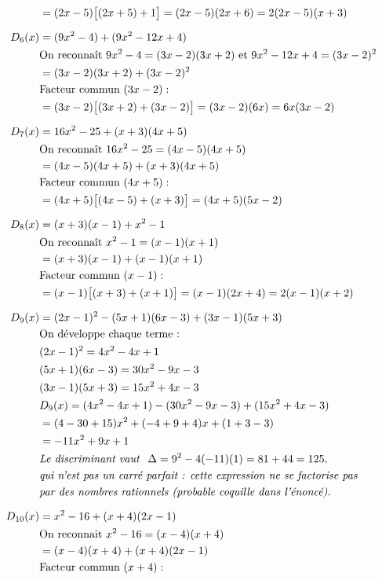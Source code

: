 \documentclass[11pt]{article}
\begin{document}
\[\begin{aligned}
		&= (2x-5)\big[(2x+5)+1\big] = (2x-5)(2x+6) = 2(2x-5)(x+3)\\[6pt]
		D_6(x) &= (9x^2-4)+(9x^2-12x+4)\\
		&\text{On reconnaît } 9x^2-4=(3x-2)(3x+2) \text{ et } 9x^2-12x+4=(3x-2)^2\\
		&= (3x-2)(3x+2)+(3x-2)^2\\
		&\text{Facteur commun } (3x-2) :\\
		&= (3x-2)\big[(3x+2)+(3x-2)\big] = (3x-2)(6x) = 6x(3x-2)\\[6pt]
		D_7(x) &= 16x^2-25+(x+3)(4x+5)\\
		&\text{On reconnaît } 16x^2-25=(4x-5)(4x+5)\\
		&= (4x-5)(4x+5)+(x+3)(4x+5)\\
		&\text{Facteur commun } (4x+5) :\\
		&= (4x+5)\big[(4x-5)+(x+3)\big] = (4x+5)(5x-2)\\[6pt]
		D_8(x) &= (x+3)(x-1)+x^2-1\\
		&\text{On reconnaît } x^2-1=(x-1)(x+1)\\
		&= (x+3)(x-1)+(x-1)(x+1)\\
		&\text{Facteur commun } (x-1) :\\
		&= (x-1)\big[(x+3)+(x+1)\big] = (x-1)(2x+4) = 2(x-1)(x+2)\\[6pt]
		D_9(x) &= (2x-1)^2-(5x+1)(6x-3)+(3x-1)(5x+3)\\
		&\text{On développe chaque terme :}\\
		&(2x-1)^2 = 4x^2-4x+1\\
		&(5x+1)(6x-3) = 30x^2-9x-3\\
		&(3x-1)(5x+3) = 15x^2+4x-3\\
		&D_9(x) = (4x^2-4x+1)-(30x^2-9x-3)+(15x^2+4x-3)\\
		&= (4-30+15)x^2+(-4+9+4)x+(1+3-3)\\
		&= -11x^2+9x+1\\
		&\text{\emph{Le discriminant vaut } } \Delta = 9^2-4(-11)(1) = 81+44 = 125,\\
		&\text{\emph{qui n'est pas un carré parfait : cette expression ne se factorise pas}}\\
		&\text{\emph{par des nombres rationnels (probable coquille dans l'énoncé).}}\\[6pt]
		D_{10}(x) &= x^2-16+(x+4)(2x-1)\\
		&\text{On reconnaît } x^2-16=(x-4)(x+4)\\
		&= (x-4)(x+4)+(x+4)(2x-1)\\
		&\text{Facteur commun } (x+4) :\\

\end{aligned}\]
\end{document}
